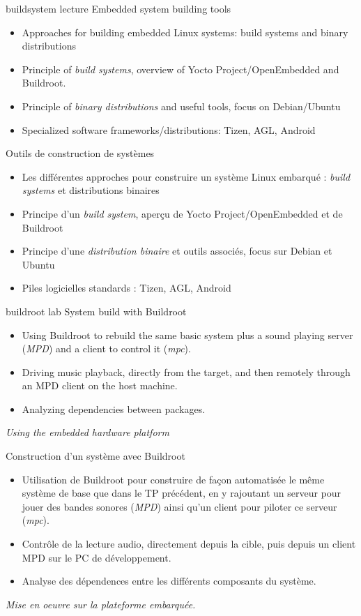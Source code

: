 {buildsystem}
{lecture}
{Embedded system building tools}
{
  \begin{itemize}
  \item Approaches for building embedded Linux systems: build systems
    and binary distributions
  \item Principle of {\em build systems}, overview of Yocto
    Project/OpenEmbedded and Buildroot.
  \item Principle of {\em binary distributions} and useful tools,
    focus on Debian/Ubuntu
  \item Specialized software frameworks/distributions: Tizen, AGL,
    Android
  \end{itemize}
}
{Outils de construction de systèmes}
{
  \begin{itemize}
  \item Les différentes approches pour construire un système Linux
    embarqué : {\em build systems} et distributions binaires
  \item Principe d'un {\em build system}, aperçu de Yocto
    Project/OpenEmbedded et de Buildroot
  \item Principe d'une {\em distribution binaire} et outils associés,
    focus sur Debian et Ubuntu
  \item Piles logicielles standards : Tizen, AGL, Android
  \end{itemize}
}
{buildroot}
{lab}
{System build with Buildroot}
{
  \begin{itemize}
  \item Using Buildroot to rebuild the same basic system
        plus a sound playing server ({\em MPD}) and a
        client to control it ({\em mpc}).
  \item Driving music playback, directly from the target,
        and then remotely through an MPD client on the
	host machine.
  \item Analyzing dependencies between packages.
  \end{itemize}

  \vspace{0.5cm}
  {\em Using the embedded hardware platform}
}
{Construction d'un système avec Buildroot}
{
  \begin{itemize}
  \item Utilisation de Buildroot pour construire de façon automatisée
    le même système de base que dans le TP précédent, en y rajoutant
    un serveur pour jouer des bandes sonores ({\em MPD}) ainsi
    qu'un client pour piloter ce serveur ({\em mpc}).
  \item Contrôle de la lecture audio, directement depuis la
    cible, puis depuis un client MPD sur le PC de développement.
  \item Analyse des dépendences entre les différents composants
    du système.
  \end{itemize}

  \vspace{0.5cm}
  {\em Mise en oeuvre sur la plateforme embarquée.}
}

